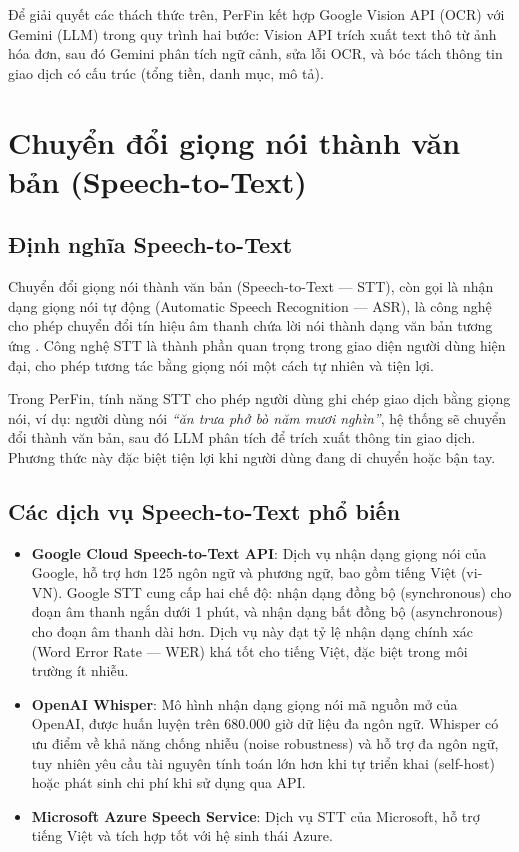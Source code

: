 Để giải quyết các thách thức trên, PerFin kết hợp Google Vision API (OCR) với Gemini (LLM) trong quy trình hai bước: Vision API trích xuất text thô từ ảnh hóa đơn, sau đó Gemini phân tích ngữ cảnh, sửa lỗi OCR, và bóc tách thông tin giao dịch có cấu trúc (tổng tiền, danh mục, mô tả).

\section{Chuyển đổi giọng nói thành văn bản (Speech-to-Text)}
\label{sec:speech_to_text}

\subsection{Định nghĩa Speech-to-Text}
\label{subsec:stt_definition}

Chuyển đổi giọng nói thành văn bản (Speech-to-Text --- STT), còn gọi là nhận dạng giọng nói tự động (Automatic Speech Recognition --- ASR), là công nghệ cho phép chuyển đổi tín hiệu âm thanh chứa lời nói thành dạng văn bản tương ứng \cite{ref14}. Công nghệ STT là thành phần quan trọng trong giao diện người dùng hiện đại, cho phép tương tác bằng giọng nói một cách tự nhiên và tiện lợi.

Trong PerFin, tính năng STT cho phép người dùng ghi chép giao dịch bằng giọng nói, ví dụ: người dùng nói \textit{``ăn trưa phở bò năm mươi nghìn''}, hệ thống sẽ chuyển đổi thành văn bản, sau đó LLM phân tích để trích xuất thông tin giao dịch. Phương thức này đặc biệt tiện lợi khi người dùng đang di chuyển hoặc bận tay.

\subsection{Các dịch vụ Speech-to-Text phổ biến}
\label{subsec:stt_services}

\begin{itemize}
    \item \textbf{Google Cloud Speech-to-Text API}: Dịch vụ nhận dạng giọng nói của Google, hỗ trợ hơn 125 ngôn ngữ và phương ngữ, bao gồm tiếng Việt (vi-VN). Google STT cung cấp hai chế độ: nhận dạng đồng bộ (synchronous) cho đoạn âm thanh ngắn dưới 1 phút, và nhận dạng bất đồng bộ (asynchronous) cho đoạn âm thanh dài hơn. Dịch vụ này đạt tỷ lệ nhận dạng chính xác (Word Error Rate --- WER) khá tốt cho tiếng Việt, đặc biệt trong môi trường ít nhiễu.

    \item \textbf{OpenAI Whisper}: Mô hình nhận dạng giọng nói mã nguồn mở của OpenAI, được huấn luyện trên 680.000 giờ dữ liệu đa ngôn ngữ. Whisper có ưu điểm về khả năng chống nhiễu (noise robustness) và hỗ trợ đa ngôn ngữ, tuy nhiên yêu cầu tài nguyên tính toán lớn hơn khi tự triển khai (self-host) hoặc phát sinh chi phí khi sử dụng qua API.

    \item \textbf{Microsoft Azure Speech Service}: Dịch vụ STT của Microsoft, hỗ trợ tiếng Việt và tích hợp tốt với hệ sinh thái Azure.
\end{itemize}

